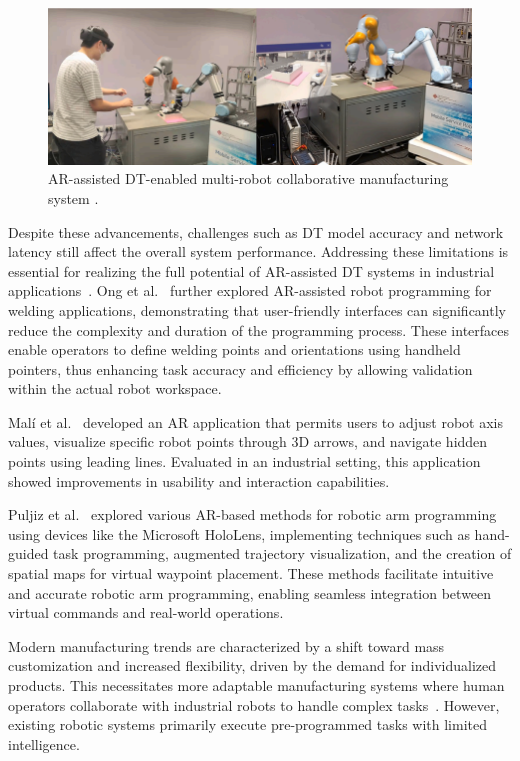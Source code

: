 \begin{figure}[!htpb]
    \centering
    \includegraphics[width=0.85\linewidth]{figs/physical-digital.png}
    \caption{\ac{AR}-assisted \ac{DT}-enabled multi-robot collaborative manufacturing system \cite{LI2022102321}.}
    \label{fig:physical-digital}
\end{figure}

Despite these advancements, challenges such as \ac{DT} model accuracy and network latency still affect the overall system performance. Addressing these limitations is essential for realizing the full potential of \ac{AR}-assisted \ac{DT} systems in industrial applications~\cite{LI2022102321}. Ong et al.~\cite{ong2020} further explored \ac{AR}-assisted robot programming for welding applications, demonstrating that user-friendly interfaces can significantly reduce the complexity and duration of the programming process. These interfaces enable operators to define welding points and orientations using handheld pointers, thus enhancing task accuracy and efficiency by allowing validation within the actual robot workspace.

Malí et al.~\cite{7819154} developed an \ac{AR} application that permits users to adjust robot axis values, visualize specific robot points through 3D arrows, and navigate hidden points using leading lines. Evaluated in an industrial setting, this application showed improvements in usability and interaction capabilities.

Puljiz et al.~\cite{puljiz2019conceptsendtoendaugmentedreality,puljiz2} explored various \ac{AR}-based methods for robotic arm programming using devices like the Microsoft HoloLens, implementing techniques such as hand-guided task programming, augmented trajectory visualization, and the creation of spatial maps for virtual waypoint placement. These methods facilitate intuitive and accurate robotic arm programming, enabling seamless integration between virtual commands and real-world operations.

Modern manufacturing trends are characterized by a shift toward mass customization and increased flexibility, driven by the demand for individualized products. This necessitates more adaptable manufacturing systems where human operators collaborate with industrial robots to handle complex tasks~\cite{1-ar-dt,2-ar-dt,3-ar-dt}. However, existing robotic systems primarily execute pre-programmed tasks with limited intelligence.

